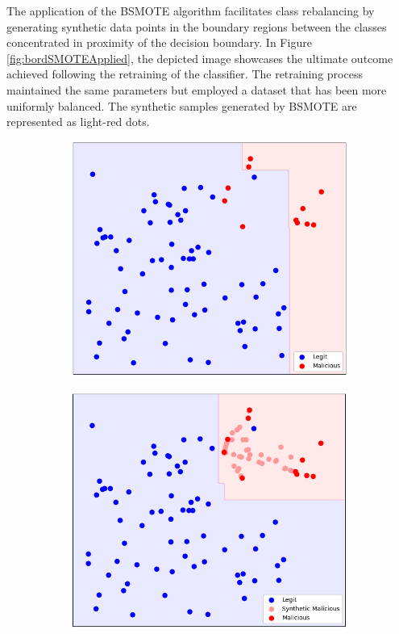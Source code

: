 The application of the BSMOTE algorithm facilitates class rebalancing by generating synthetic data points in the boundary regions between the classes concentrated in proximity of the decision boundary.
In Figure \ref{fig:bordSMOTEApplied}, the depicted image showcases the ultimate outcome achieved following the retraining of the classifier. 
The retraining process maintained the same parameters but employed a dataset that has been more uniformly balanced.
The synthetic samples generated by BSMOTE are represented as light-red dots.
\begin{figure}[H]
  \centering
  \begin{subfigure}{0.45\linewidth}
    \includegraphics[width=\linewidth]{graphics/BordSMOTE_no.png}
    \caption{}
    \label{fig:bordSMOTEnotApplied}
  \end{subfigure}
  \hspace{0.01\linewidth}
  \begin{subfigure}{0.45\linewidth}
    \includegraphics[width=\linewidth]{graphics/BordSMOTE_yes.png}

\end{subfigure}
\end{figure}
